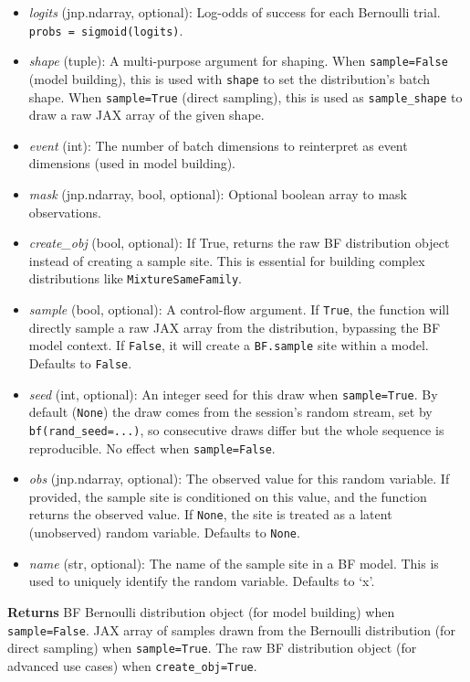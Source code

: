 \documentclass[
  letterpaper,
  DIV=11,
  numbers=noendperiod]{scrartcl}
\begin{document}
\begin{itemize}
\item
  \emph{logits} (jnp.ndarray, optional): Log-odds of success for each
  Bernoulli trial. \texttt{probs\ =\ sigmoid(logits)}.
\item
  \emph{shape} (tuple): A multi-purpose argument for shaping. When
  \texttt{sample=False} (model building), this is used with
  \texttt{shape} to set the distribution's batch shape. When
  \texttt{sample=True} (direct sampling), this is used as
  \texttt{sample\_shape} to draw a raw JAX array of the given shape.
\item
  \emph{event} (int): The number of batch dimensions to reinterpret as
  event dimensions (used in model building).
\item
  \emph{mask} (jnp.ndarray, bool, optional): Optional boolean array to
  mask observations.
\item
  \emph{create\_obj} (bool, optional): If True, returns the raw BF
  distribution object instead of creating a sample site. This is
  essential for building complex distributions like
  \texttt{MixtureSameFamily}.
\item
  \emph{sample} (bool, optional): A control-flow argument. If
  \texttt{True}, the function will directly sample a raw JAX array from
  the distribution, bypassing the BF model context. If \texttt{False},
  it will create a \texttt{BF.sample} site within a model. Defaults to
  \texttt{False}.
\item
  \emph{seed} (int, optional): An integer seed for this draw when
  \texttt{sample=True}. By default (\texttt{None}) the draw comes from
  the session's random stream, set by \texttt{bf(rand\_seed=...)}, so
  consecutive draws differ but the whole sequence is reproducible. No
  effect when \texttt{sample=False}.
\item
  \emph{obs} (jnp.ndarray, optional): The observed value for this random
  variable. If provided, the sample site is conditioned on this value,
  and the function returns the observed value. If \texttt{None}, the
  site is treated as a latent (unobserved) random variable. Defaults to
  \texttt{None}.
\item
  \emph{name} (str, optional): The name of the sample site in a BF
  model. This is used to uniquely identify the random variable. Defaults
  to `x'.
\end{itemize}

\textbf{Returns} BF Bernoulli distribution object (for model building)
when \texttt{sample=False}. JAX array of samples drawn from the
Bernoulli distribution (for direct sampling) when \texttt{sample=True}.
The raw BF distribution object (for advanced use cases) when
\texttt{create\_obj=True}.
\end{document}
